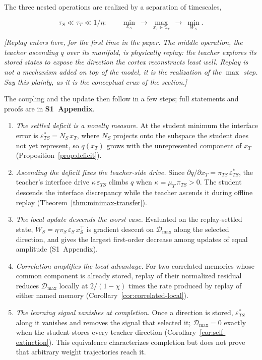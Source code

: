 \documentclass[10pt,letterpaper]{article}
\theoremstyle{plain}
\theoremstyle{remark}
\begin{document}
The three nested operations are realized by a separation of timescales,

\begin{equation}
\tau_S\ll\tau_T\ll 1/\eta:
\qquad
\min_{x_S}\ \longrightarrow\ \max_{x_T\in\mathbb S_T}\ \longrightarrow\ \min_{W_S}.
\label{eq:timescales}
\end{equation}

\textit{[Replay enters here, for the first time in the paper. The middle operation, the teacher ascending $q$ over its manifold, is physically replay: the teacher explores its stored states to expose the direction the cortex reconstructs least well. Replay is not a mechanism added on top of the model, it is the realization of the $\max$ step. Say this plainly, as it is the conceptual crux of the section.]}

The coupling and the update then follow in a few steps; full statements and proofs are in \textbf{S1~Appendix}.

\begin{enumerate}
\item \emph{The settled deficit is a novelty measure.} At the student minimum the interface error is $\varepsilon_{TS}^\ast=N_S\,x_T$, where $N_S$ projects onto the subspace the student does not yet represent, so $q(x_T)$ grows with the unrepresented component of $x_T$ (Proposition~\ref{prop:deficit}).
\item \emph{Ascending the deficit fixes the teacher-side drive.} Since $\partial q/\partial x_T=\pi_{TS}\,\varepsilon_{TS}^\ast$, the teacher's interface drive $\kappa\,\varepsilon_{TS}$ climbs $q$ when $\kappa=\mu_T\,\pi_{TS}>0$. The student descends the interface discrepancy while the teacher ascends it during offline replay (Theorem~\ref{thm:minimax-transfer}).
\item \emph{The local update descends the worst case.} Evaluated on the replay-settled state, $\dot W_S=\eta\,\pi_S\,\varepsilon_S\,x_S^\top$ is gradient descent on $\mathcal D_{\max}$ along the selected direction, and gives the largest first-order decrease among updates of equal amplitude (S1~Appendix).
\item \emph{Correlation amplifies the local advantage.} For two correlated memories whose common component is already stored, replay of their normalized residual reduces $\mathcal D_{\max}$ locally at $2/(1-\chi)$ times the rate produced by replay of either named memory (Corollary~\ref{cor:correlated-local}).
\item \emph{The learning signal vanishes at completion.} Once a direction is stored, $\varepsilon_{TS}^\ast$ along it vanishes and removes the signal that selected it; $\mathcal D_{\max}=0$ exactly when the student stores every teacher direction (Corollary~\ref{cor:self-extinction}). This equivalence characterizes completion but does not prove that arbitrary weight trajectories reach it.
\end{enumerate}
\end{document}
